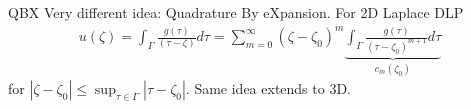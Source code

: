 \documentclass[t]{beamer}
\begin{document}
\begin{noframe}{QBX}
  Very different idea: Quadrature By eXpansion. For 2D Laplace DLP
  \begin{align}
    u(\zeta) = 
    \int_\Gamma \frac{g(\tau)}{(\tau-\zeta)} d\tau =
    \sum_{m=0}^\infty (\zeta-\zeta_0)^m
    \underbrace{
    \int_\Gamma \frac{g(\tau)}{(\tau-\zeta_0)^{m+1}} d\tau
    }_{c_m(\zeta_0)}
  \end{align}
  for $|\zeta-\zeta_0| \le \sup_{\tau\in\Gamma} |\tau-\zeta_0|$.
  \pause
  Same idea extends to 3D.
  \begin{columns}
    \begin{column}{0.5\textwidth}
\end{column}
\end{columns}
\end{noframe}
\end{document}
